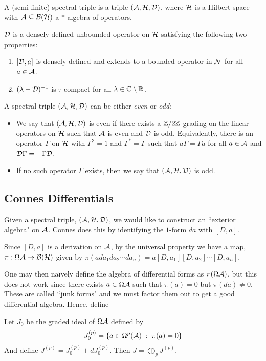\begin{definition}
    A (semi-finite) spectral triple is a triple $(\mathcal{A},\mathcal{H},\mathcal{D})$, where
    $\mathcal{H}$ is a Hilbert space with $\mathcal{A} \subseteq \mathcal{B}(\mathcal{H})$
    a $*$-algebra of operators.
    
    $\mathcal{D}$ is a densely defined unbounded operator on $\mathcal{H}$ satisfying the following
    two properties:
    \begin{enumerate}
        \item{} $[\mathcal{D},a]$ is densely defined and extends to a bounded operator in $\mathcal{N}$
        for all $a \in \mathcal{A}$.
        \item{} $(\lambda -\mathcal{D})^{-1}$ is $\tau$-compact for all $\lambda \in \mathbb{C}\setminus \mathbb{R}$.
    \end{enumerate}
    
    A spectral triple $(\mathcal{A},\mathcal{H},\mathcal{D})$ can be either \emph{even} or \emph{odd}:
    \begin{itemize}
        \item{} We say that $(\mathcal{A},\mathcal{H},\mathcal{D})$ is even if there exists a
        $\mathbb{Z}/2\mathbb{Z}$ grading on the linear operators on $\mathcal{H}$ such that $\mathcal{A}$
        is even and $\mathcal{D}$ is odd. Equivalently, there is an operator $\Gamma$
        on $\mathcal{H}$ with $\Gamma^2 = 1$ and $\Gamma^* = \Gamma$ such that $a\Gamma = \Gamma a$ for all $a \in \mathcal{A}$
        and $\mathcal{D}\Gamma=-\Gamma\mathcal{D}$. 
        \item{} If no such operator $\Gamma$ exists, then we say that $(\mathcal{A},\mathcal{H},\mathcal{D})$
        is odd.
    \end{itemize}
\end{definition}



\subsection{Connes Differentials}
Given a spectral triple, $(\mathcal{A},\mathcal{H},\mathcal{D})$, we would like to construct an ``exterior algebra"
on $\mathcal{A}$. Connes does this by identifying the $1$-form $da$ with $[D,a]$.

Since $[D,a]$ is a derivation on $\mathcal{A}$, by the universal property we have a map, $\pi:\Omega\mathcal{A}\rightarrow \mathcal{B}(\mathcal{H})$
given by $\pi(ada_1da_2\cdots da_n) = a[D,a_1][D,a_2]\cdots[D,a_n]$.

One may then na\"ively define the algebra of differential forms as $\pi(\Omega \mathcal{A})$,
but this does not work since there exists $a \in \Omega \mathcal{A}$ such that $\pi(a) = 0$
but $\pi(da) \neq 0$. These are called ``junk forms" and we must factor them out to get
a good differential algebra. Hence, define
\begin{theorem}
    Let $J_0$ be the graded ideal of $\Omega \mathcal{A}$ defined by 
    \begin{equation*}
        J_0^{(p)} = \{a \in \Omega^p(\mathcal{A}) \;:\; \pi(a) = 0\}
    \end{equation*}
    And define $J^{(p)} = J_0^{(p)} + dJ_0^{(p)}$. Then $J = \bigoplus_p J^{(p)}$.
\end{theorem}

